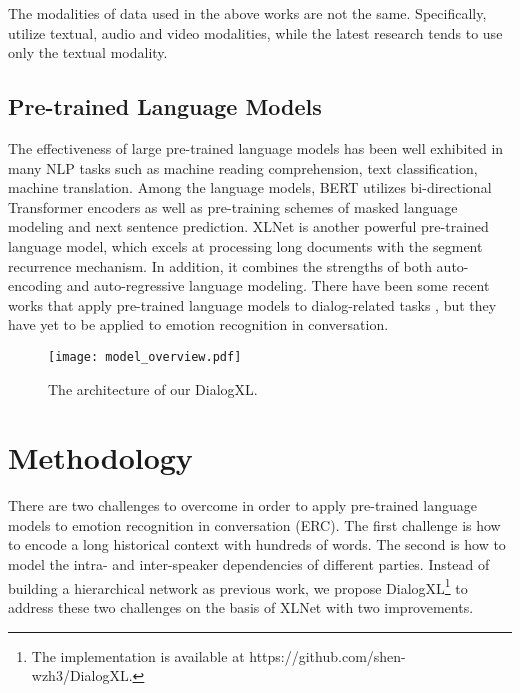 \documentclass[letterpaper]{article} \usepackage{aaai21}  \usepackage{times}  \usepackage{helvet} \usepackage{courier}  \usepackage[hyphens]{url}  \usepackage{graphicx} \usepackage{amstext}
\begin{document}
The modalities of data used in the above works are not the same. Specifically, \cite{hazarika2018icon,hazarika2018conversational,majumder2019dialoguernn} utilize textual, audio and video modalities, while the latest research \cite{jiao2019higru,ghosal2019dialoguegcn,zhong2019knowledge,hazarika2019emotion} tends to use only the textual modality.

\subsection{Pre-trained Language Models}
The effectiveness of large pre-trained language models \cite{devlin2018bert, yang2019xlnet, liu2019roberta, conneau2020unsupervised} has been well exhibited in many NLP tasks such as machine reading comprehension, text classification, machine translation. Among the language models, BERT \cite{devlin2018bert} utilizes bi-directional Transformer encoders as well as pre-training schemes of masked language modeling and next sentence prediction. XLNet \cite{yang2019xlnet} is another powerful pre-trained language model, which excels at processing long documents with the segment recurrence mechanism. In addition, it combines the strengths of both auto-encoding and auto-regressive language modeling. There have been some recent works that apply pre-trained language models to  dialog-related tasks \cite{bao2020plato,ham2020end, henderson2019convert}, but they have yet to be applied to emotion recognition in conversation.

\begin{figure*}[t]
	\centering
	\texttt{[image: model\_overview.pdf]} \caption{The architecture of our DialogXL.}
	\label{fig:model_overview}
\end{figure*} 

\section{Methodology}
There are two challenges to overcome in order to apply pre-trained language models to emotion recognition in conversation (ERC). The first challenge is how to encode a long historical context with hundreds of words. The second is how to model the intra- and inter-speaker dependencies of different parties. Instead of building a hierarchical network as previous work, we propose DialogXL\footnote{The implementation is available at https://github.com/shen-wzh3/DialogXL.} to address these two challenges on the basis of XLNet with two improvements. 
\end{document}
